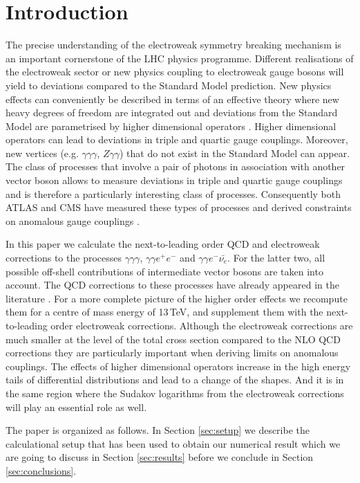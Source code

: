 \section{Introduction}
\label{sec:intro}

The precise understanding of the electroweak symmetry breaking 
mechanism is an important cornerstone of the LHC physics 
programme. 
Different realisations of the electroweak sector or new physics 
coupling to electroweak gauge bosons will yield to deviations 
compared to the Standard Model prediction. 
New physics effects can conveniently be described in terms of 
an effective theory where new heavy degrees of freedom are 
integrated out and deviations from the Standard Model are 
parametrised by higher dimensional operators 
\cite{Weinberg:1978kz,Weinberg:1979pi}. 
Higher dimensional operators can lead to deviations in triple 
and quartic gauge couplings. Moreover, new vertices 
(e.g. $\gamma\gamma\gamma$, $Z\gamma\gamma$) that do not 
exist in the Standard Model can appear. 
The class of processes that involve a pair of photons in 
association with another vector boson allows to measure 
deviations in triple and quartic gauge couplings and is 
therefore a particularly interesting class of processes. 
Consequently both ATLAS and CMS have measured these types of 
processes and derived constraints on anomalous gauge couplings 
\cite{Aad:2016sau,Sirunyan:2017lvq,Aad:2015uqa,Aad:2015bua}. 

In this paper we calculate the next-to-leading order QCD and 
electroweak corrections to the processes $\gamma\gamma\gamma$, 
$\gamma\gamma e^{+} e^{-}$ and $\gamma\gamma e^{-} \bar{\nu_e}$. 
For the latter two, all possible off-shell contributions of 
intermediate vector bosons are taken into account. 
The QCD corrections to these processes have already appeared 
in the literature 
\cite{Bozzi:2011en,Campbell:2012ft,Bozzi:2011wwa}. 
For a more complete picture of the higher order effects we 
recompute them for a centre of mass energy of 
13\,TeV, and supplement them with the next-to-leading order 
electroweak corrections. 
Although the electroweak corrections are much smaller at the level 
of the total cross section compared to the NLO QCD corrections 
they are particularly important when deriving limits on 
anomalous couplings. 
The effects of higher dimensional operators increase in the 
high energy tails of differential distributions and lead to a 
change of the shapes. And it is in the same region where the 
Sudakov logarithms from the electroweak corrections will play 
an essential role as well.

The paper is organized as follows. 
In Section \ref{sec:setup} we describe the calculational setup 
that has been used to obtain our numerical result which we are 
going to discuss in Section \ref{sec:results} before we 
conclude in Section \ref{sec:conclusions}.
 